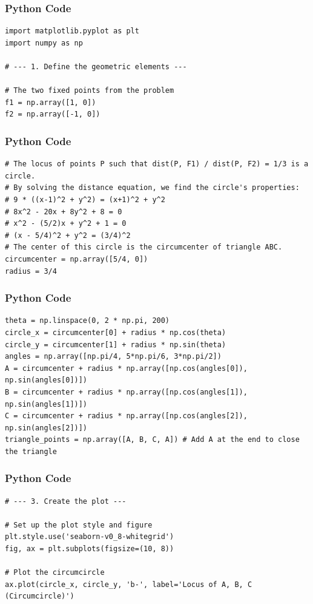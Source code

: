 \documentclass{beamer}
\begin{document}
\begin{frame}[fragile]
    \frametitle{Python Code}
    \begin{lstlisting}
import matplotlib.pyplot as plt
import numpy as np

# --- 1. Define the geometric elements ---

# The two fixed points from the problem
f1 = np.array([1, 0])
f2 = np.array([-1, 0])
\end{lstlisting}
\end{frame}

\begin{frame}[fragile]
\frametitle{Python Code}
\begin{lstlisting}
# The locus of points P such that dist(P, F1) / dist(P, F2) = 1/3 is a circle.
# By solving the distance equation, we find the circle's properties:
# 9 * ((x-1)^2 + y^2) = (x+1)^2 + y^2
# 8x^2 - 20x + 8y^2 + 8 = 0
# x^2 - (5/2)x + y^2 + 1 = 0
# (x - 5/4)^2 + y^2 = (3/4)^2
# The center of this circle is the circumcenter of triangle ABC.
circumcenter = np.array([5/4, 0])
radius = 3/4
\end{lstlisting}
\end{frame}

\begin{frame}[fragile]
\frametitle{Python Code}
\begin{lstlisting}
theta = np.linspace(0, 2 * np.pi, 200)
circle_x = circumcenter[0] + radius * np.cos(theta)
circle_y = circumcenter[1] + radius * np.sin(theta)
angles = np.array([np.pi/4, 5*np.pi/6, 3*np.pi/2])
A = circumcenter + radius * np.array([np.cos(angles[0]), np.sin(angles[0])])
B = circumcenter + radius * np.array([np.cos(angles[1]), np.sin(angles[1])])
C = circumcenter + radius * np.array([np.cos(angles[2]), np.sin(angles[2])])
triangle_points = np.array([A, B, C, A]) # Add A at the end to close the triangle
\end{lstlisting}
\end{frame}

\begin{frame}[fragile]
\frametitle{Python Code}
\begin{lstlisting}
# --- 3. Create the plot ---

# Set up the plot style and figure
plt.style.use('seaborn-v0_8-whitegrid')
fig, ax = plt.subplots(figsize=(10, 8))

# Plot the circumcircle
ax.plot(circle_x, circle_y, 'b-', label='Locus of A, B, C (Circumcircle)')

\end{lstlisting}
\end{frame}
\end{document}
